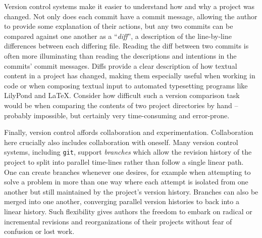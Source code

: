 Version control systems make it easier to understand how and why a project was
changed. Not only does each commit have a commit message, allowing the author
to provide some explanation of their actions, but any two commits can be
compared against one another as a \enquote{\emph{diff}}, a description of the
line-by-line differences between each differing file. Reading the diff between
two commits is often more illuminating than reading the descriptions and
intentions in the commits' commit messages. Diffs provide a clear
description of how textual content in a project has changed, making them
especially useful when working in code or when composing textual input to
automated typesetting programs like LilyPond and LaTeX. Consider how difficult
such a version comparison task would be when comparing the contents of two
project directories by hand -- probably impossible, but certainly very
time-consuming and error-prone.

Finally, version control affords collaboration and experimentation.
Collaboration here crucially also includes collaboration with oneself. Many
version control systems, including \texttt{git}, support \emph{branches} which
allow the revision history of the project to split into parallel time-lines
rather than follow a single linear path. One can create branches whenever one
desires, for example when attempting to solve a problem in more than one way
where each attempt is isolated from one another but still maintained by the
project's version history. Branches can also be merged into one another,
converging parallel version histories to back into a linear history. Such
flexibility gives authors the freedom to embark on radical or incremental
revisions and reorganizations of their projects without fear of confusion or
lost work.

